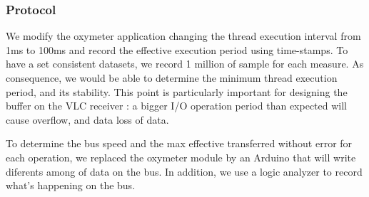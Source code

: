 \subsubsection{Protocol}
We modify the oxymeter application changing the thread execution interval from 1ms to 100ms and record the effective execution period using time-stamps. To have a set consistent datasets, we record 1 million of sample for each measure. As consequence, we would be able to determine the minimum thread execution period, and its stability.
This point is particularly important for designing the buffer on the VLC receiver : a bigger I/O operation period than expected will cause overflow, and data loss of data.

To determine the bus speed and the max effective transferred without error for each operation, we replaced the oxymeter module by an Arduino that will write diferents among of data on the bus. In addition, we use a logic analyzer to record what's happening on the bus.

